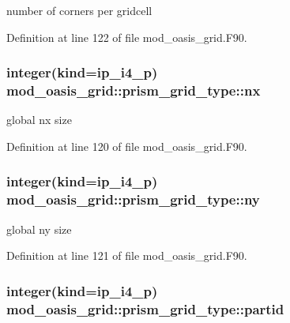 number of corners per gridcell 



Definition at line 122 of file mod\+\_\+oasis\+\_\+grid.\+F90.

\hypertarget{structmod__oasis__grid_1_1prism__grid__type_ad27a1fc4d01d2b69f95d7cf9bcdbe571}{
\subsubsection[{nx}]{\setlength{\rightskip}{0pt plus 5cm}integer(kind=ip\+\_\+i4\+\_\+p) mod\+\_\+oasis\+\_\+grid\+::prism\+\_\+grid\+\_\+type\+::nx\hspace{0.3cm}{\ttfamily [private]}}}\label{structmod__oasis__grid_1_1prism__grid__type_ad27a1fc4d01d2b69f95d7cf9bcdbe571}


global nx size 



Definition at line 120 of file mod\+\_\+oasis\+\_\+grid.\+F90.

\hypertarget{structmod__oasis__grid_1_1prism__grid__type_ad12673fd6c928ed6441e5584c16d0a3e}{
\subsubsection[{ny}]{\setlength{\rightskip}{0pt plus 5cm}integer(kind=ip\+\_\+i4\+\_\+p) mod\+\_\+oasis\+\_\+grid\+::prism\+\_\+grid\+\_\+type\+::ny\hspace{0.3cm}{\ttfamily [private]}}}\label{structmod__oasis__grid_1_1prism__grid__type_ad12673fd6c928ed6441e5584c16d0a3e}


global ny size 



Definition at line 121 of file mod\+\_\+oasis\+\_\+grid.\+F90.

\hypertarget{structmod__oasis__grid_1_1prism__grid__type_a8638cf8b735e72872be089682d0f8340}{
\subsubsection[{partid}]{\setlength{\rightskip}{0pt plus 5cm}integer(kind=ip\+\_\+i4\+\_\+p) mod\+\_\+oasis\+\_\+grid\+::prism\+\_\+grid\+\_\+type\+::partid\hspace{0.3cm}{\ttfamily [private]}}}\label{structmod__oasis__grid_1_1prism__grid__type_a8638cf8b735e72872be089682d0f8340}


